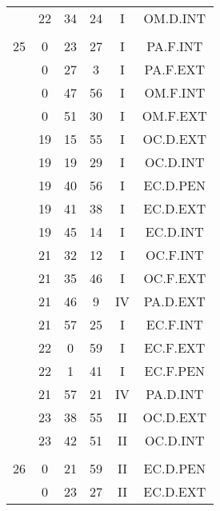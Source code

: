 \documentclass[12pt, a4paper]{article}
\begin{document}
\begin{multicols}{3}
{\begin{tabular}{c c c c c c}
	 	 	 	 & 22 & 34 & 24 & I & OM.D.INT\\%
	 	 	 	 & & & & & \\%
	 	 	 	25 & 0 & 23 & 27 & I & PA.F.INT\\%
	 	 	 	 & 0 & 27 & 3 & I & PA.F.EXT\\%
	 	 	 	 & 0 & 47 & 56 & I & OM.F.INT\\%
	 	 	 	 & 0 & 51 & 30 & I & OM.F.EXT\\%
	 	 	 	 & 19 & 15 & 55 & I & OC.D.EXT\\%
	 	 	 	 & 19 & 19 & 29 & I & OC.D.INT\\%
	 	 	 	 & 19 & 40 & 56 & I & EC.D.PEN\\%
	 	 	 	 & 19 & 41 & 38 & I & EC.D.EXT\\%
	 	 	 	 & 19 & 45 & 14 & I & EC.D.INT\\%
	 	 	 	 & 21 & 32 & 12 & I & OC.F.INT\\%
	 	 	 	 & 21 & 35 & 46 & I & OC.F.EXT\\%
	 	 	 	 & 21 & 46 & 9 & IV & PA.D.EXT\\%
	 	 	 	 & 21 & 57 & 25 & I & EC.F.INT\\%
	 	 	 	 & 22 & 0 & 59 & I & EC.F.EXT\\%
	 	 	 	 & 22 & 1 & 41 & I & EC.F.PEN\\%
	 	 	 	 & 21 & 57 & 21 & IV & PA.D.INT\\%
	 	 	 	 & 23 & 38 & 55 & II & OC.D.EXT\\%
	 	 	 	 & 23 & 42 & 51 & II & OC.D.INT\\%
	 	 	 	 & & & & & \\%
	 	 	 	26 & 0 & 21 & 59 & II & EC.D.PEN\\%
	 	 	 	 & 0 & 23 & 27 & II & EC.D.EXT\\%

\end{tabular}}
\end{multicols}
\end{document}
